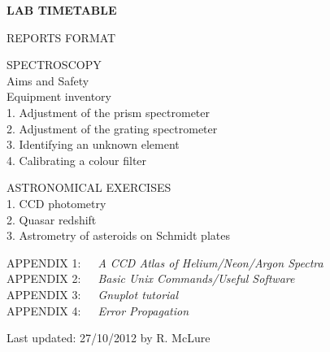 \documentclass[12pt]{article}
\begin{document}
{\bf
LAB TIMETABLE

REPORTS FORMAT

SPECTROSCOPY \\
\hspace*{2cm} Aims and Safety \\
\hspace*{2cm} Equipment inventory\\
\hspace*{2cm}1.  Adjustment of the prism spectrometer\\
\hspace*{2cm}2. Adjustment of the grating spectrometer\\
\hspace*{2cm}3. Identifying an unknown element\\
\hspace*{2cm}4. Calibrating a colour filter 

ASTRONOMICAL EXERCISES \\
\hspace*{2cm}1. CCD photometry\\
\hspace*{2cm}2. Quasar redshift \\
\hspace*{2cm}3. Astrometry of asteroids on Schmidt plates


APPENDIX 1:\ \ \ {\large\sl A CCD Atlas of Helium/Neon/Argon Spectra}\\
APPENDIX 2:\ \ \ {\large\sl Basic Unix Commands/Useful Software}\\
APPENDIX 3:\ \ \ {\large\sl Gnuplot tutorial}\\
APPENDIX 4:\ \ \ {\large\sl Error Propagation}\\
\vspace*{4cm}


\noindent
Last updated: 27/10/2012 by R. McLure


}

\newpage


\end{document}
